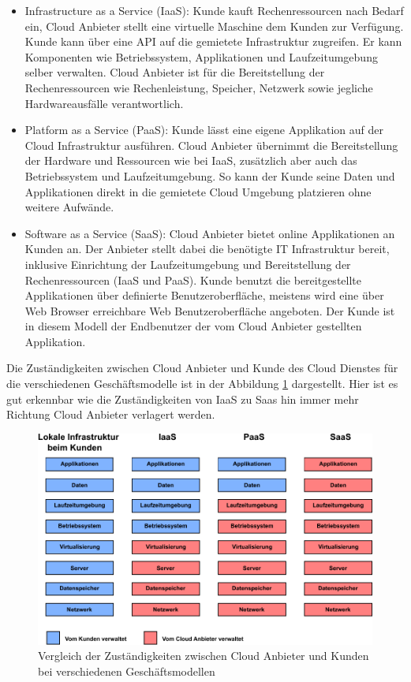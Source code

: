 \begin{itemize}
	\item Infrastructure as a Service (IaaS): Kunde kauft Rechenressourcen nach Bedarf ein, Cloud Anbieter stellt eine \gls{virtuelle Maschine} dem Kunden zur Verfügung. Kunde kann über eine API auf die gemietete Infrastruktur zugreifen. Er kann Komponenten wie Betriebssystem, Applikationen und Laufzeitumgebung selber verwalten. Cloud Anbieter ist für die Bereitstellung der Rechenressourcen wie Rechenleistung, Speicher, Netzwerk sowie jegliche Hardwareausfälle verantwortlich.
	\item Platform as a Service (PaaS): Kunde lässt eine eigene Applikation auf der Cloud Infrastruktur ausführen. Cloud Anbieter übernimmt die Bereitstellung der Hardware und Ressourcen wie bei IaaS, zusätzlich aber auch das Betriebssystem und Laufzeitumgebung. So kann der Kunde seine Daten und Applikationen direkt in die gemietete Cloud Umgebung platzieren ohne weitere Aufwände.
	\item Software as a Service (SaaS): Cloud Anbieter bietet online Applikationen an Kunden an. Der Anbieter stellt dabei die benötigte IT Infrastruktur bereit, inklusive Einrichtung der Laufzeitumgebung und Bereitstellung der Rechenressourcen (IaaS und PaaS). Kunde benutzt die bereitgestellte Applikationen über definierte Benutzeroberfläche, meistens wird eine über Web Browser erreichbare Web Benutzeroberfläche angeboten. Der Kunde ist in diesem Modell der Endbenutzer der vom Cloud Anbieter gestellten Applikation.

\end{itemize} \cite{Mell2011}

Die Zuständigkeiten zwischen Cloud Anbieter und Kunde des Cloud Dienstes für die verschiedenen Geschäftsmodelle ist in der Abbildung \ref{cloud_modelle} dargestellt. Hier ist es gut erkennbar wie die Zuständigkeiten von IaaS zu Saas hin immer mehr Richtung Cloud Anbieter verlagert werden.

\begin{figure}[htbp]
	\centering
	\includegraphics[width=\textwidth]{./content/graphics/cloud_models.pdf}
	\caption{Vergleich der Zuständigkeiten zwischen Cloud Anbieter und Kunden bei verschiedenen Geschäftsmodellen}
	\label{cloud_modelle}
\end{figure}

